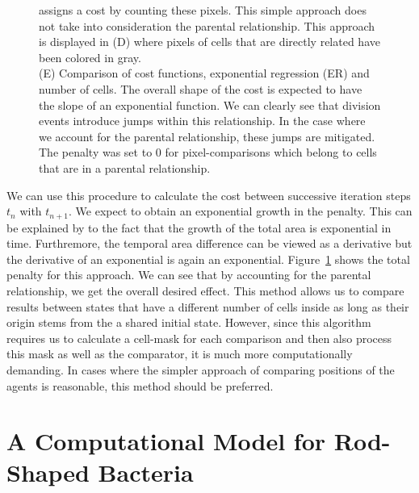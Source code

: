 \documentclass{article}
\begin{document}
\begin{figure}[H]
{        assigns a cost by counting these pixels.
        This simple approach does not take into consideration the parental relationship.
        This approach is displayed in (D) where pixels of cells that are directly related have been
        colored in gray.\\
        (E) Comparison of cost functions, exponential regression (ER) and number of cells.
        The overall shape of the cost is expected to have the slope of an exponential function.
        We can clearly see that division events introduce jumps within this relationship.
        In the case where we account for the parental relationship, these jumps are mitigated.
        The penalty was set to $0$ for pixel-comparisons which belong to cells that are in a
        parental relationship.
    }
    \label{fig:mask-difference-metric}
\end{figure}

We can use this procedure to calculate the cost between successive iteration steps
$t_n$ with $t_{n+1}$.
We expect to obtain an exponential growth in the penalty.
This can be explained by to the fact that the growth of the total area is exponential in time.
Furthremore, the temporal area difference can be viewed as a derivative but the derivative of an
exponential is again an exponential.
Figure~\ref{fig:mask-difference-metric} shows the total penalty for this approach.
We can see that by accounting for the parental relationship, we get the overall desired effect.
This method allows us to compare results between states that have a different number of cells
inside as long as their origin stems from the a shared initial state.
However, since this algorithm requires us to calculate a cell-mask for each comparison and then also
process this mask as well as the comparator, it is much more computationally demanding.
In cases where the simpler approach of comparing positions of the agents is reasonable, this method
should be preferred.

\section{A Computational Model for Rod-Shaped Bacteria}
\label{subsubsection:mechanical-model-rod-shaped-bacteria}
\end{document}
